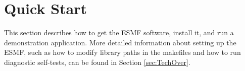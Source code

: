 \section{Quick Start}
\label{sec:QuickStart}

This section describes how to get the ESMF software, install it, 
and run a demonstration application.  More detailed information about 
setting up the ESMF, such as how to modify library paths in the 
makefiles and how to run diagnostic self-tests, can be found in 
Section \ref{sec:TechOver}.  





